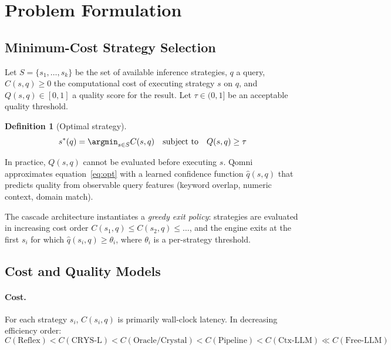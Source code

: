 \documentclass[12pt,a4paper]{article}
\newtheorem{definition}{Definition}
\begin{document}
\section{Problem Formulation}
\label{sec:problem}

\subsection{Minimum-Cost Strategy Selection}

Let $S = \{s_1, \ldots, s_k\}$ be the set of available inference strategies,
$q$ a query, $C(s,q) \geq 0$ the computational cost of executing strategy $s$
on $q$, and $Q(s,q) \in [0,1]$ a quality score for the result.
Let $\tau \in (0,1]$ be an acceptable quality threshold.

\begin{definition}[Optimal strategy]
\begin{equation}
  s^*(q) = \argmin_{s \in S} C(s, q)
  \quad \text{subject to} \quad Q(s, q) \geq \tau
  \label{eq:opt}
\end{equation}
\end{definition}

In practice, $Q(s,q)$ cannot be evaluated before executing $s$.
Qomni approximates equation~\eqref{eq:opt} with a learned confidence
function $\hat{q}(s, q)$ that predicts quality from observable query features
(keyword overlap, numeric context, domain match).

The cascade architecture instantiates a \emph{greedy exit policy}: strategies
are evaluated in increasing cost order $C(s_1,q) \leq C(s_2,q) \leq \ldots$,
and the engine exits at the first $s_i$ for which
$\hat{q}(s_i, q) \geq \theta_i$, where $\theta_i$ is a per-strategy threshold.

\subsection{Cost and Quality Models}

\paragraph{Cost.} For each strategy $s_i$, $C(s_i, q)$ is primarily wall-clock
latency. In decreasing efficiency order:
\[
  C(\text{Reflex}) < C(\text{CRYS-L}) < C(\text{Oracle/Crystal}) < C(\text{Pipeline}) < C(\text{Ctx-LLM}) \ll C(\text{Free-LLM})
\]
\end{document}
